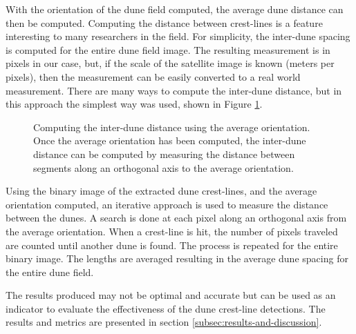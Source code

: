 With the orientation of the dune field computed, the average dune distance can then be computed. Computing the distance between crest-lines is a feature interesting to many researchers in the field. For simplicity, the inter-dune spacing is computed for the entire dune field image. The resulting measurement is in pixels in our case, but, if the scale of the satellite image is known (meters per pixels), then the measurement can be easily converted to a real world measurement. There are many ways to compute the inter-dune distance, but in this approach the simplest way was used, shown in Figure \ref{fig:inter-dune-distance-computation}. 

\begin{figure}
	\centering
	\caption{ Computing the inter-dune distance using the average orientation. Once the average orientation has been computed, the inter-dune distance can be computed by measuring the distance between segments along an orthogonal axis to the average orientation.}
	\label{fig:inter-dune-distance-computation}
\end{figure}

Using the binary image of the extracted dune crest-lines, and the average orientation computed, an iterative approach is used to measure the distance between the dunes. A search is done at each pixel along an orthogonal axis from the average orientation. When a crest-line is hit, the number of pixels traveled are counted until another dune is found. The process is repeated for the entire binary image. The lengths are averaged resulting in the average dune spacing for the entire dune field.

The results produced may not be optimal and accurate but can be used as an indicator to evaluate the effectiveness of the dune crest-line detections. The results and metrics are presented in section \ref{subsec:results-and-discussion}.